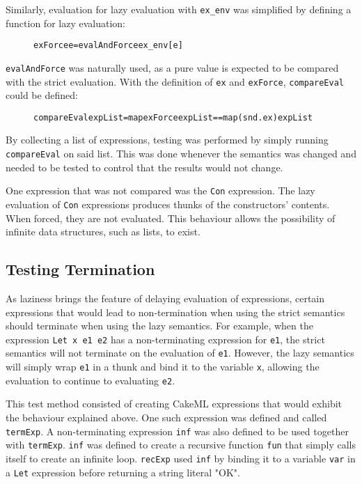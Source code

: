 \noindent Similarly, evaluation for lazy evaluation with \texttt{ex\_env} was
simplified by defining a function for lazy evaluation:

\begin{figure}[H]
\begin{alltt}
  exForce e = evalAndForce ex_env [e]
\end{alltt}
\end{figure}

\noindent \texttt{evalAndForce} was naturally used, as a pure value is expected
to be compared with the strict evaluation. With the definition of \texttt{ex}
and \texttt{exForce}, \texttt{compareEval} could be defined:

\begin{figure}[H]
\begin{alltt}
  compareEval expList = map exForce expList == map (snd . ex) expList
\end{alltt}
\end{figure}

By collecting a list of expressions, testing was performed by simply running
\texttt{compareEval} on said list. This was done whenever the semantics was
changed and needed to be tested to control that the results would not change.

One expression that was not compared was the \texttt{Con} expression. The lazy
evaluation of \texttt{Con} expressions produces thunks of the constructors'
contents. When forced, they are not evaluated. This behaviour allows the
possibility of infinite data structures, such as lists, to exist.

\subsection{Testing Termination}
As laziness brings the feature of delaying evaluation of expressions, certain
expressions that would lead to non-termination when using the strict semantics
should terminate when using the lazy semantics. For example, when the expression
\texttt{Let x e1 e2} has a non-terminating expression for \texttt{e1}, the
strict semantics will not terminate on the evaluation of \texttt{e1}. However,
the lazy semantics will simply wrap \texttt{e1} in a thunk and bind it to the
variable \texttt{x}, allowing the evaluation to continue to evaluating
\texttt{e2}.

This test method consisted of creating CakeML expressions that would exhibit the
behaviour explained above. One such expression was defined and called
\texttt{termExp}. A non-terminating expression \texttt{inf} was also defined to
be used together with \texttt{termExp}.
\texttt{inf} was defined to create a recursive function \texttt{fun}
that simply calls itself to create an infinite loop. \texttt{recExp} used
\texttt{inf} by binding it to a variable \texttt{var} in a \texttt{Let}
expression before returning a string literal "OK".

